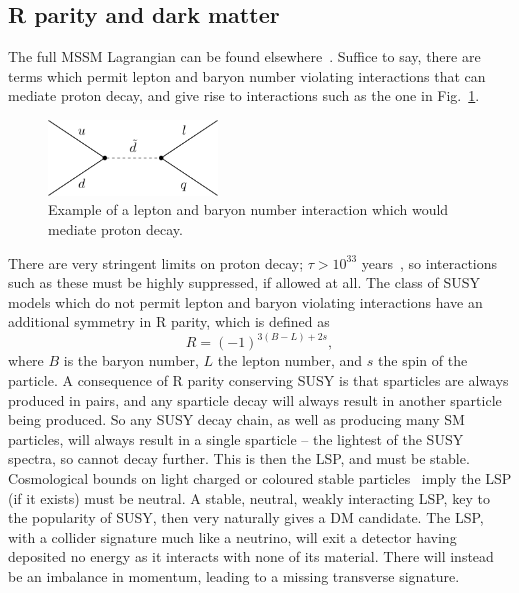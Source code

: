 \subsection{R parity and dark matter\label{th:RParity}}
The full \ac{MSSM} Lagrangian can be found elsewhere~\cite{susyandsuch}. 
Suffice to say, there are terms which permit lepton and baryon number violating interactions that can mediate proton decay, and give rise to interactions such as the one in Fig.~\ref{fig:pdecay}.
\begin{figure}[htbp]
  \begin{center}
  \includegraphics[width=0.4\textwidth]{Figures/theory/RPVpdecay}
  \caption{Example of a lepton and baryon number interaction which would mediate proton decay.}
  \label{fig:pdecay}
  \end{center}
\end{figure}
There are very stringent limits on proton decay; $\tau > 10^{33}$ years~\cite{PDG}, so interactions such as these must be highly suppressed, if allowed at all. 
The class of \ac{SUSY} models which do not permit lepton and baryon violating interactions have an additional symmetry in R parity, which is defined as
\begin{equation}
R = (-1)^{3(B-L)+2s},
\end{equation}
where $B$ is the baryon number, $L$ the lepton number, and $s$ the spin of the particle.
A consequence of R parity conserving \ac{SUSY} is that sparticles are always produced in pairs, and any sparticle decay will always result in another sparticle being produced.
So any \ac{SUSY} decay chain, as well as producing many \ac{SM} particles, will always result in a single sparticle -- the lightest of the \ac{SUSY} spectra, so cannot decay further.
This is then the \ac{LSP}, and must be stable.
Cosmological bounds on light charged or coloured stable particles~\cite{PDG} imply the \ac{LSP} (if it exists) must be neutral.
A stable, neutral, weakly interacting \ac{LSP}, key to the popularity of \ac{SUSY}, then very naturally gives a \ac{DM} candidate.
The \ac{LSP}, with a collider signature much like a neutrino, will exit a detector having deposited no energy as it interacts with none of its material.
There will instead be an imbalance in momentum, leading to a missing transverse  signature.

